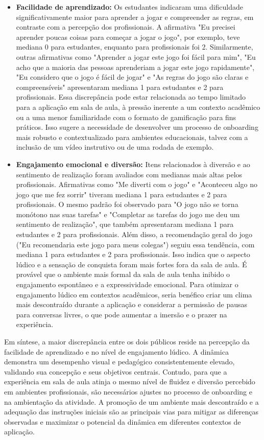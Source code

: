 \documentclass[
	12pt,
	openright,
	twoside,
	a4paper,
	english,
	brazil
	]{abntex2}
\begin{document}
\begin{itemize}
  \item \textbf{Facilidade de aprendizado:} Os estudantes indicaram uma dificuldade significativamente maior para aprender a jogar e compreender as regras, em contraste com a percepção dos profissionais. A afirmativa "Eu precisei aprender poucas coisas para começar a jogar o jogo", por exemplo, teve mediana 0 para estudantes, enquanto para profissionais foi 2. Similarmente, outras afirmativas como "Aprender a jogar este jogo foi fácil para mim", "Eu acho que a maioria das pessoas aprenderiam a jogar este jogo rapidamente", "Eu considero que o jogo é fácil de jogar" e "As regras do jogo são claras e compreensíveis" apresentaram mediana 1 para estudantes e 2 para profissionais. Essa discrepância pode estar relacionada ao tempo limitado para a aplicação em sala de aula, à pressão inerente a um contexto acadêmico ou a uma menor familiaridade com o formato de gamificação para fins práticos. Isso sugere a necessidade de desenvolver um processo de onboarding mais robusto e contextualizado para ambientes educacionais, talvez com a inclusão de um vídeo instrutivo ou de uma rodada de exemplo.

  \item \textbf{Engajamento emocional e diversão:} Itens relacionados à diversão e ao sentimento de realização foram avaliados com medianas mais altas pelos profissionais. Afirmativas como "Me diverti com o jogo" e "Aconteceu algo no jogo que me fez sorrir" tiveram mediana 1 para estudantes e 2 para profissionais. O mesmo padrão foi observado para "O jogo não se torna monótono nas suas tarefas" e "Completar as tarefas do jogo me deu um sentimento de realização", que também apresentaram mediana 1 para estudantes e 2 para profissionais. Além disso, a recomendação geral do jogo ("Eu recomendaria este jogo para meus colegas") seguiu essa tendência, com mediana 1 para estudantes e 2 para profissionais. Isso indica que o aspecto lúdico e a sensação de conquista foram mais fortes fora da sala de aula. É provável que o ambiente mais formal da sala de aula tenha inibido o engajamento espontâneo e a expressividade emocional. Para otimizar o engajamento lúdico em contextos acadêmicos, seria benéfico criar um clima mais descontraído durante a aplicação e considerar a permissão de pausas para conversas livres, o que pode aumentar a imersão e o prazer na experiência.
\end{itemize}

Em síntese, a maior discrepância entre os dois públicos reside na percepção da facilidade de aprendizado e no nível de engajamento lúdico. A dinâmica demonstra um desempenho visual e pedagógico consistentemente elevado, validando sua concepção e seus objetivos centrais. Contudo, para que a experiência em sala de aula atinja o mesmo nível de fluidez e diversão percebido em ambientes profissionais, são necessários ajustes no processo de onboarding e na ambientação da atividade. A promoção de um ambiente mais descontraído e a adequação das instruções iniciais são as principais vias para mitigar as diferenças observadas e maximizar o potencial da dinâmica em diferentes contextos de aplicação.
\end{document}
